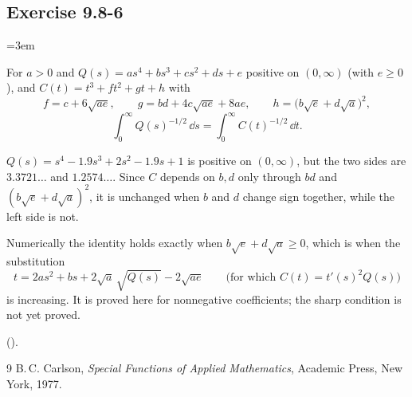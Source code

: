 \documentclass[11pt,a4paper]{article}
\newcommand{\entry}[1]{\par\addvspace{1.5ex}\needspace{5\baselineskip}%
  \subsection{#1}}
\newenvironment{fields}{\begin{description}[font=\normalfont\itshape,
  leftmargin=1.5em, labelindent=0pt, itemsep=0.4ex, topsep=0.3ex, parsep=0.3ex]%
  \setlength{\parindent}{0pt}\RaggedRight\emergencystretch=3em}{\end{description}}
\begin{document}
\entry{Exercise 9.8-6}
\begin{fields}
\item[As stated] For $a>0$ and $Q(s)=as^4+bs^3+cs^2+ds+e$ positive on $(0,\infty)$ (with
  $e\ge0$), and $C(t)=t^3+ft^2+gt+h$ with
  \[
    f=c+6\sqrt{ae},\qquad g=bd+4c\sqrt{ae}+8ae,\qquad h=\bigl(b\sqrt e+d\sqrt a\bigr)^2,
  \]
  \[
    \int_0^\infty Q(s)^{-1/2}\,\dd s=\int_0^\infty C(t)^{-1/2}\,\dd t .
  \]
\item[Counterexample] $Q(s)=s^4-1.9s^3+2s^2-1.9s+1$ is positive on $(0,\infty)$, but the two
  sides are $3.3721\ldots$ and $1.2574\ldots$. Since $C$ depends on $b,d$ only through $bd$ and
  $(b\sqrt e+d\sqrt a)^2$, it is unchanged when $b$ and $d$ change sign together, while the
  left side is not.
\item[Correction] Numerically the identity holds exactly when $b\sqrt e+d\sqrt a\ge0$, which is
  when the substitution
  \[
    t=2as^2+bs+2\sqrt a\,\sqrt{Q(s)}-2\sqrt{ae}\qquad\bigl(\text{for which }C(t)=t'(s)^2Q(s)\bigr)
  \]
  is increasing. It is proved here for nonnegative coefficients; the sharp condition is not yet
  proved.
\item[Lean] 
  ().
\end{fields}

\begin{thebibliography}{9}
 B.\,C. Carlson, \emph{Special Functions of Applied Mathematics},
  Academic Press, New York, 1977.
\end{thebibliography}
\end{document}

